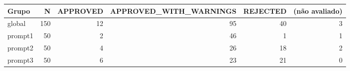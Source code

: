 \begin{tabular}{lrrrrr}
\toprule
Grupo & N & APPROVED & APPROVED\_WITH\_WARNINGS & REJECTED & (não avaliado) \\
\midrule
global & 150 & 12 & 95 & 40 & 3 \\
prompt1 & 50 & 2 & 46 & 1 & 1 \\
prompt2 & 50 & 4 & 26 & 18 & 2 \\
prompt3 & 50 & 6 & 23 & 21 & 0 \\
\bottomrule
\end{tabular}
